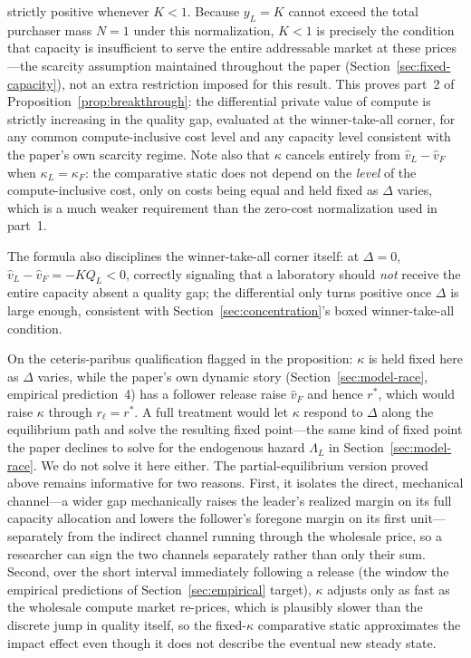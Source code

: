 \documentclass[11pt]{article}
\begin{document}
strictly positive whenever $K<1$. Because $y_L=K$ cannot exceed the total purchaser mass $N=1$ under this normalization, $K<1$ is precisely the condition that capacity is insufficient to serve the entire addressable market at these prices---the scarcity assumption maintained throughout the paper (Section~\ref{sec:fixed-capacity}), not an extra restriction imposed for this result. This proves part~2 of Proposition~\ref{prop:breakthrough}: the differential private value of compute is strictly increasing in the quality gap, evaluated at the winner-take-all corner, for any common compute-inclusive cost level and any capacity level consistent with the paper's own scarcity regime. Note also that $\kappa$ cancels entirely from $\widehat v_L-\widehat v_F$ when $\kappa_L=\kappa_F$: the comparative static does not depend on the \emph{level} of the compute-inclusive cost, only on costs being equal and held fixed as $\Delta$ varies, which is a much weaker requirement than the zero-cost normalization used in part~1.

The formula also disciplines the winner-take-all corner itself: at $\Delta=0$, $\widehat v_L-\widehat v_F=-KQ_L<0$, correctly signaling that a laboratory should \emph{not} receive the entire capacity absent a quality gap; the differential only turns positive once $\Delta$ is large enough, consistent with Section~\ref{sec:concentration}'s boxed winner-take-all condition.

On the ceteris-paribus qualification flagged in the proposition: $\kappa$ is held fixed here as $\Delta$ varies, while the paper's own dynamic story (Section~\ref{sec:model-race}, empirical prediction~4) has a follower release raise $\widehat v_F$ and hence $r^*$, which would raise $\kappa$ through $r_\ell=r^*$. A full treatment would let $\kappa$ respond to $\Delta$ along the equilibrium path and solve the resulting fixed point---the same kind of fixed point the paper declines to solve for the endogenous hazard $\Lambda_L$ in Section~\ref{sec:model-race}. We do not solve it here either. The partial-equilibrium version proved above remains informative for two reasons. First, it isolates the direct, mechanical channel---a wider gap mechanically raises the leader's realized margin on its full capacity allocation and lowers the follower's foregone margin on its first unit---separately from the indirect channel running through the wholesale price, so a researcher can sign the two channels separately rather than only their sum. Second, over the short interval immediately following a release (the window the empirical predictions of Section~\ref{sec:empirical} target), $\kappa$ adjusts only as fast as the wholesale compute market re-prices, which is plausibly slower than the discrete jump in quality itself, so the fixed-$\kappa$ comparative static approximates the impact effect even though it does not describe the eventual new steady state.



\end{document}
